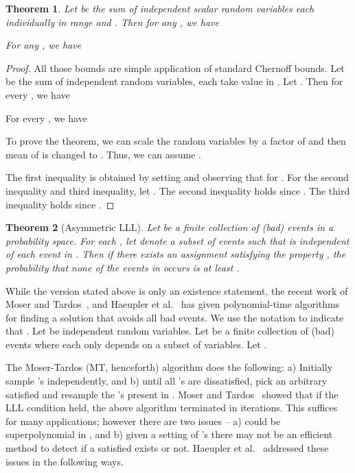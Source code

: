\documentclass[11pt]{article}
\newtheorem{theorem}{Theorem} \newtheorem{lemma}{Lemma}[section]
\newcounter{prop}
\begin{document}
\begin{theorem}
\label{thm:Chernoff}
Let  be the sum of independent scalar random variables each individually in range  and . Then for any , we have

For any , we have
\ifdefined\CR

\else

\fi
\end{theorem}
\begin{proof}
All those bounds are simple application of standard Chernoff bounds.  Let  be the sum of  independent random variables, each take value in .  Let . Then for every , we have 

For every , we have 


To prove the theorem, we can scale the random variables by a factor of  and then mean of  is changed to . Thus, we can assume .  

The first inequality is obtained by setting  and observing that  for .  For the second inequality and third inequality, let . The second inequality holds since . The third inequality holds since .

\end{proof}
\begin{theorem}[Asymmetric LLL]\label{thm:lll}
Let  be a finite collection of (bad) events in a probability space.
For each , let  denote a subset of events such that  is independent of each event in . Then if there exists an assignment 
 satisfying the property ,
the probability that none of the events in  occurs is at least .
\end{theorem}

While the version stated above is only an existence statement, the recent work of Moser and Tardos~\cite{MT10}, and Haeupler et al.~\cite{HSS11} has given polynomial-time algorithms for finding a solution that avoids all bad events. We  use the notation  to indicate that .
Let  be  independent random variables. Let  be a finite collection of (bad) events where each  only depends on a subset  of variables.   Let .  

The Moser-Tardos (MT, henceforth) algorithm does the following: a) Initially sample 's independently, and b) until all 's are dissatisfied, pick an arbitrary satisfied  and resample the 's present in .
Moser and Tardos~\cite{MT10} showed that if the LLL condition held, the above algorithm terminated in  iterations. 
This suffices for many applications; however there are two issues -- a)  could be superpolynomial in , and b) given a setting of 's there may not be an efficient method to detect if a satisfied  exists or not.
Haeupler et al.~\cite{HSS11} addressed these issues in the following ways. 
\end{document}
